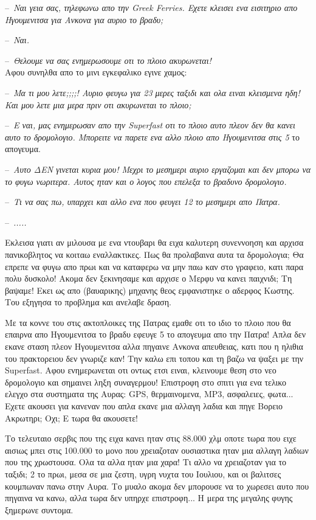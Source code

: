 \documentclass[11pt, letterpaper]{book}
\newcommand\dialogue[1]{\par\noindent--~\textit{#1}}
\begin{document}
\dialogue{Ναι γεια σας, τηλεφωνω απο την Greek Ferries. Eχετε κλεισει ενα εισιτηριο απο Ηγουμενιτσα για Ανκονα για αυριο το βραδυ;}
\dialogue{Ναι.}
\dialogue{Θελουμε να σας ενημερωσουμε οτι το πλοιο ακυρωνεται!}\\


\noindent Αφου συνηλθα απο το μινι εγκεφαλικο εγινε χαμος:\\

\dialogue{Μα τι μου λετε;;;;! Αυριο φευγω για 23 μερες ταξιδι και ολα ειναι κλεισμενα ηδη! Και μου λετε μια μερα πριν οτι ακυρωνεται το πλοιο;}
\dialogue{Ε ναι, μας ενημερωσαν απο την Superfast οτι το πλοιο αυτο πλεον δεν θα κανει αυτο το δρομολογιο. Μπορειτε να παρετε ενα αλλο πλοιο απο Ηγουμενιτσα στις 5 }το απογευμα.
\dialogue{Αυτο ΔΕΝ γινεται κυρια μου! Μεχρι το μεσημερι αυριο εργαζομαι και δεν μπορω να το φυγω νωριτερα. Αυτος ηταν και ο λογος που επελεξα το βραδυνο δρομολογιο.}
\dialogue{Τι να σας πω, υπαρχει και αλλο ενα που φευγει 12 το μεσημερι απο Πατρα.}
\dialogue{.....}

Εκλεισα γιατι αν μιλουσα με ενα ντουβαρι θα ειχα καλυτερη συνεννοηση και αρχισα πανικοβλητος να κοιταω εναλλακτικες. Πως θα προλαβαινα αυτα τα δρομολογια; Θα επρεπε να φυγω απο πρωι και να καταφερω να μην παω καν στο γραφειο, κατι παρα πολυ δυσκολο! Ακομα δεν ξεκινησαμε και αρχισε ο Μερφυ να κανει παιχνιδι; Τη βαψαμε! Εκει ως απο (βαυαρικης) μηχανης θεος εμφανιστηκε ο αδερφος Κωστης. Του εξηγησα το προβλημα και ανελαβε δραση.

Με τα κοννε του στις ακτοπλοικες της Πατρας εμαθε οτι το ιδιο το πλοιο που θα επαιρνα απο Ηγουμενιτσα το βραδυ εφευγε 5 το απογευμα απο την Πατρα! Απλα δεν εκανε σταση πλεον Ηγουμενιτσα αλλα πηγαινε Ανκονα απευθειας, κατι που η ηλιθια του πρακτορειου δεν γνωριζε καν! Την καλω επι τοπου και τη βαζω να ψαξει με την Superfast. Αφου ενημερωνεται οτι οντως ετσι ειναι, κλεινουμε θεση στο νεο δρομολογιο και σημαινει ληξη συναγερμου! Επιστροφη στο σπιτι για ενα τελικο ελεγχο στα συστηματα της Αυρας: GPS, θερμαινομενα, MP3, ασφαλειες, φωτα... Εχετε ακουσει για κανεναν που απλα εκανε μια αλλαγη λαδια και πηγε Βορειο Ακρωτηρι; Οχι; Ε τωρα θα ακουσετε!

 Το τελευταιο σερβις που της ειχα κανει ηταν στις 88.000 χλμ οποτε τωρα που ειχε αισιως μπει στις 100.000 το μονο που χρειαζοταν ουσιαστικα ηταν μια αλλαγη λαδιων που της χρωστουσα. Ολα τα αλλα ηταν μια χαρα! Τι αλλο να χρειαζοταν για το ταξιδι; 2 το πρωι, μεσα σε μια ζεστη, υγρη νυχτα του Ιουλιου, και οι βαλιτσες κουμπωναν πανω στην Αυρα. Το μυαλο ακομα δεν μπορουσε να το χωρεσει αυτο που πηγαινα να κανω, αλλα τωρα δεν υπηρχε επιστροφη... Η μερα της μεγαλης φυγης ξημερωνε συντομα.
\end{document}

